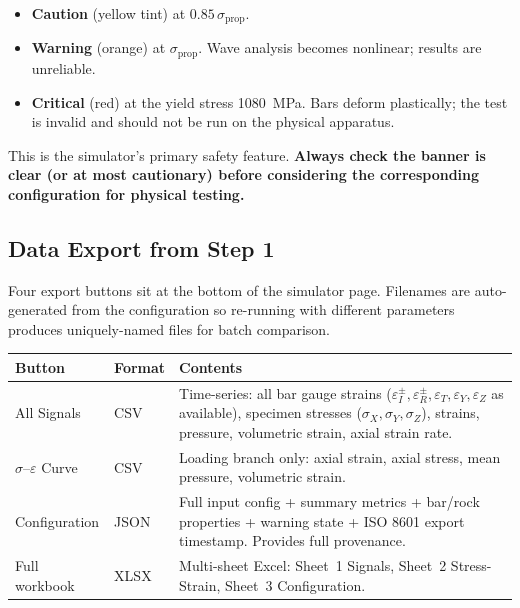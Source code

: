 \documentclass[11pt,a4paper]{article}
\providecommand{\SI}[2]{\qty{#1}{#2}}
\newcommand{\sig}{\sigma}
\newcommand{\eps}{\varepsilon}
\newcommand{\sigprop}{\sig_{\text{prop}}}
\begin{document}
\begin{itemize}[leftmargin=*, itemsep=2pt]
  \item \textcolor{warnorange}{\textbf{Caution}} (yellow tint) at
        $0.85\,\sigprop$.
  \item \textcolor{warnorange}{\textbf{Warning}} (orange) at $\sigprop$.
        Wave analysis becomes nonlinear; results are unreliable.
  \item \textcolor{dangerred}{\textbf{Critical}} (red) at the yield stress
        \SI{1080}{MPa}. Bars deform plastically; the test is invalid and
        should not be run on the physical apparatus.
\end{itemize}

This is the simulator's primary safety feature. \textbf{Always check the banner
is clear (or at most cautionary) before considering the corresponding
configuration for physical testing.}

\subsection{Data Export from Step 1}

Four export buttons sit at the bottom of the simulator page. Filenames are
auto-generated from the configuration so re-running with different parameters
produces uniquely-named files for batch comparison.

\begin{center}
\renewcommand{\arraystretch}{1.4}
\small
\begin{tabular}{@{}p{3.6cm}p{2cm}p{8.5cm}@{}}
\toprule
\textbf{Button} & \textbf{Format} & \textbf{Contents} \\
\midrule
All Signals & CSV &
  Time-series: all bar gauge strains
  ($\eps_I^{\pm}, \eps_R^{\pm}, \eps_T, \eps_Y, \eps_Z$ as available),
  specimen stresses ($\sig_X, \sig_Y, \sig_Z$), strains, pressure,
  volumetric strain, axial strain rate. \\
$\sig$--$\eps$ Curve & CSV &
  Loading branch only: axial strain, axial stress, mean pressure,
  volumetric strain. \\
Configuration & JSON &
  Full input config + summary metrics + bar/rock properties + warning
  state + ISO 8601 export timestamp. Provides full provenance. \\
Full workbook & XLSX &
  Multi-sheet Excel: Sheet~1 Signals, Sheet~2 Stress-Strain,
  Sheet~3 Configuration. \\
\bottomrule
\end{tabular}
\end{center}
\end{document}
